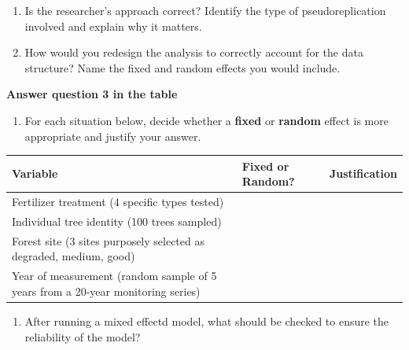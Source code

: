 \documentclass[
]{book}
\newcounter{none} %
\providecommand{\tightlist}{%
  \setlength{\itemsep}{0pt}\setlength{\parskip}{0pt}}
\begin{document}
\begin{enumerate}
\def\labelenumi{\arabic{enumi}.}
\item
  Is the researcher's approach correct? Identify the type of pseudoreplication involved and explain why it matters.
\item
  How would you redesign the analysis to correctly account for the data structure? Name the fixed and random effects you would include.
\end{enumerate}

\textbf{Answer question 3 in the table}

\begin{enumerate}
\def\labelenumi{\arabic{enumi}.}
\setcounter{enumi}{2}
\tightlist
\item
  For each situation below, decide whether a \textbf{fixed} or \textbf{random} effect is more appropriate and justify your answer.
\end{enumerate}

{\def\LTcaptype{none} %
\begin{longtable}[]{@{}
  >{\raggedright\arraybackslash}p{}
  >{\raggedright\arraybackslash}p{}
  >{\raggedright\arraybackslash}p{}@{}}
\toprule\noalign{}
\begin{minipage}[b]{\linewidth}\raggedright
Variable
\end{minipage} & \begin{minipage}[b]{\linewidth}\raggedright
Fixed or Random?
\end{minipage} & \begin{minipage}[b]{\linewidth}\raggedright
Justification
\end{minipage} \\
\midrule\noalign{}
\endhead
\bottomrule\noalign{}
\endlastfoot
Fertilizer treatment (4 specific types tested) & & \\
Individual tree identity (100 trees sampled) & & \\
Forest site (3 sites purposely selected as degraded, medium, good) & & \\
Year of measurement (random sample of 5 years from a 20-year monitoring series) & & \\
\end{longtable}
}

\begin{enumerate}
\def\labelenumi{\arabic{enumi}.}
\setcounter{enumi}{3}
\tightlist
\item
  After running a mixed effectd model, what should be checked to ensure the reliability of the model?
\end{enumerate}
\end{document}
